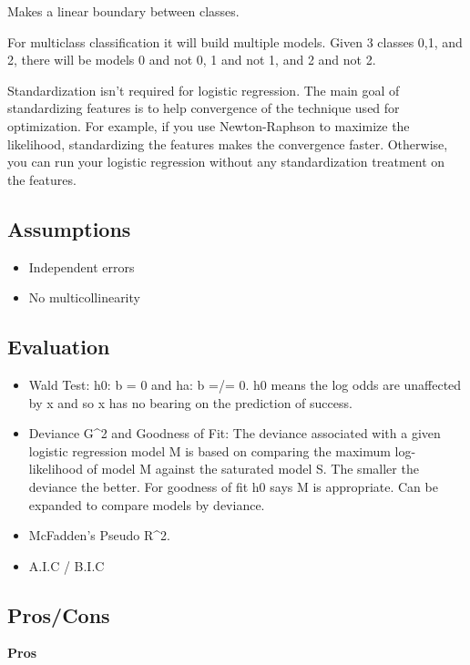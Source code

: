 \documentclass[]{book}
\theoremstyle{definition}
\theoremstyle{definition}
\theoremstyle{definition}
\theoremstyle{remark}
\begin{document}
Makes a linear boundary between classes.

For multiclass classification it will build multiple models. Given 3
classes 0,1, and 2, there will be models 0 and not 0, 1 and not 1, and 2
and not 2.

Standardization isn't required for logistic regression. The main goal of
standardizing features is to help convergence of the technique used for
optimization. For example, if you use Newton-Raphson to maximize the
likelihood, standardizing the features makes the convergence faster.
Otherwise, you can run your logistic regression without any
standardization treatment on the features.

\subsection{Assumptions}\label{assumptions-8}

\begin{itemize}
\item
  Independent errors
\item
  No multicollinearity
\end{itemize}

\subsection{Evaluation}\label{evaluation-8}

\begin{itemize}
\item
  Wald Test: h0: b = 0 and ha: b =/= 0. h0 means the log odds are
  unaffected by x and so x has no bearing on the prediction of success.
\item
  Deviance G\^{}2 and Goodness of Fit: The deviance associated with a
  given logistic regression model M is based on comparing the maximum
  log-likelihood of model M against the saturated model S. The smaller
  the deviance the better. For goodness of fit h0 says M is appropriate.
  Can be expanded to compare models by deviance.
\item
  McFadden's Pseudo R\^{}2.
\item
  A.I.C / B.I.C
\end{itemize}

\subsection{Pros/Cons}\label{proscons-8}

\textbf{Pros}
\end{document}
